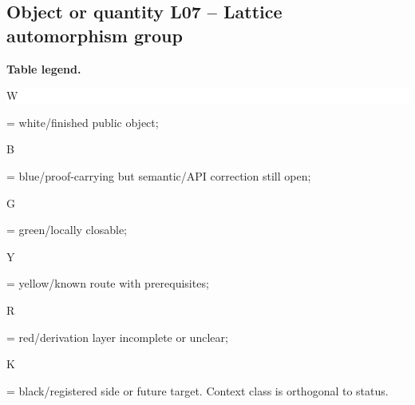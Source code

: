 \subsection*{Object or quantity L07 -- Lattice automorphism group}
\hypertarget{objproof:L07}{}
\par\smallskip\noindent\begin{minipage}{0.99\linewidth}\footnotesize\raggedright\textbf{Table legend.} \colorbox{white}{\strut W} = white/finished public object; \colorbox{cyan!20}{\strut B} = blue/proof-carrying but semantic/API correction still open; \colorbox{green!18}{\strut G} = green/locally closable; \colorbox{yellow!25}{\strut Y} = yellow/known route with prerequisites; \colorbox{red!20}{\strut R} = red/derivation layer incomplete or unclear; \colorbox{black!18}{\strut K} = black/registered side or future target. Context class is orthogonal to status.\end{minipage}\par\vspace{0.25em}
